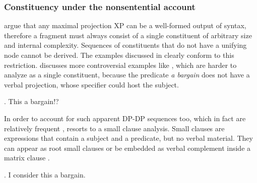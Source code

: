 \subsubsection{Constituency under the nonsentential account}
\citet{barton.progovac2005} argue that any maximal projection XP can be a well-formed output of syntax, therefore a fragment must always consist of a single constituent of arbitrary size and internal complexity. Sequences of constituents that do not have a unifying node cannot be derived. The examples discussed in \citet{barton.progovac2005} clearly conform to this restriction. \citet{progovac2006} discusses more controversial examples like \Next, which are harder to analyze as a single constituent, because the predicate \textit{a bargain} does not have a verbal projection, whose specifier could host the subject.

\ex. This a bargain!? \hfill \citep[28]{progovac2006} \label{ex:progovac.sc-bargain-root}

In order to account for such apparent DP-DP sequences too, which in fact are relatively frequent \citep{reich2017}, \citet{progovac2006} resorts to a small clause analysis. Small clauses \citep{williams1975, stowell1981} are expressions that contain a subject and a predicate, but no verbal material. They can appear as root small clauses \Last or be embedded as verbal complement inside a matrix clause \Next.

\ex. I consider this a bargain. \hfill \citep[41]{progovac2006} \label{ex:progovac.sc-bargain-embedded}

